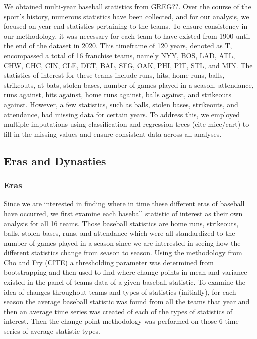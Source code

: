 \documentclass[
  12pt,
]{article}
\begin{document}
We obtained multi-year baseball statistics from GREG??. Over the course
of the sport's history, numerous statistics have been collected, and for
our analysis, we focused on year-end statistics pertaining to the teams.
To ensure consistency in our methodology, it was necessary for each team
to have existed from 1900 until the end of the dataset in 2020. This
timeframe of 120 years, denoted as T, encompassed a total of 16
franchise teams, namely NYY, BOS, LAD, ATL, CHW, CHC, CIN, CLE, DET,
BAL, SFG, OAK, PHI, PIT, STL, and MIN. The statistics of interest for
these teams include runs, hits, home runs, balls, strikeouts, at-bats,
stolen bases, number of games played in a season, attendance, runs
against, hits against, home runs against, balls against, and strikeouts
against. However, a few statistics, such as balls, stolen bases,
strikeouts, and attendance, had missing data for certain years. To
address this, we employed multiple imputations using classification and
regression trees (cite mice/cart) to fill in the missing values and
ensure consistent data across all analyses.

\hypertarget{eras-and-dynasties}{%
\subsection{Eras and Dynasties}\label{eras-and-dynasties}}

\hypertarget{eras}{%
\subsubsection{Eras}\label{eras}}

Since we are interested in finding where in time these different eras of
baseball have occurred, we first examine each baseball statistic of
interest as their own analysis for all 16 teams. Those baseball
statistics are home runs, strikeouts, balls, stolen bases, runs, and
attendance which were all standardized to the number of games played in
a season since we are interested in seeing how the different statistics
change from season to season. Using the methodology from Cho and Fry
(CITE) a thresholding parameter was determined from bootstrapping and
then used to find where change points in mean and variance existed in
the panel of teams data of a given baseball statistic. To examine the
idea of changes throughout teams and types of statistics (initially),
for each season the average baseball statistic was found from all the
teams that year and then an average time series was created of each of
the types of statistics of interest. Then the change point methodology
was performed on those 6 time series of average statistic types.
\end{document}

